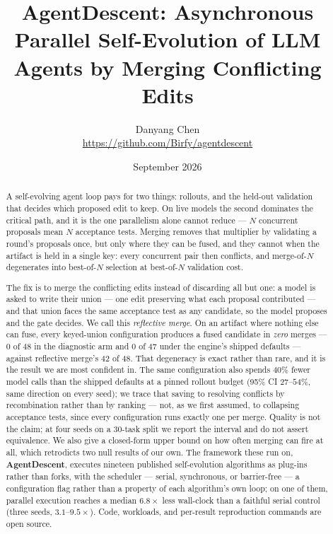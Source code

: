 \documentclass{article}
\title{AgentDescent: Asynchronous Parallel Self-Evolution of LLM Agents by Merging Conflicting Edits}
\author{
  Danyang Chen\\[2pt]
  \small\url{https://github.com/Birfy/agentdescent}
}
\date{September 2026}
\begin{document}
\maketitle

\begin{abstract}
A self-evolving agent loop pays for two things: rollouts, and the held-out validation that decides which proposed edit to keep. On live models the second dominates the critical path, and it is the one parallelism alone cannot reduce --- $N$ concurrent proposals mean $N$ acceptance tests. Merging removes that multiplier by validating a round's proposals once, but only where they can be fused, and they cannot when the artifact is held in a single key: every concurrent pair then conflicts, and merge-of-$N$ degenerates into best-of-$N$ selection at best-of-$N$ validation cost.

The fix is to merge the conflicting edits instead of discarding all but one: a model is asked to write their union --- one edit preserving what each proposal contributed --- and that union faces the same acceptance test as any candidate, so the model proposes and the gate decides. We call this \emph{reflective merge}. On an artifact where nothing else can fuse, every keyed-union configuration produces a fused candidate in \emph{zero} merges --- $0$ of $48$ in the diagnostic arm and $0$ of $47$ under the engine's shipped defaults --- against reflective merge's $42$ of $48$. That degeneracy is exact rather than rare, and it is the result we are most confident in. The same configuration also spends $40\%$ fewer model calls than the shipped defaults at a pinned rollout budget (95\% CI $27$--$54\%$, same direction on every seed); we trace that saving to resolving conflicts by recombination rather than by ranking --- not, as we first assumed, to collapsing acceptance tests, since every configuration runs exactly one per merge. Quality is not the claim; at four seeds on a 30-task split we report the interval and do not assert equivalence. We also give a closed-form upper bound on how often merging can fire at all, which retrodicts two null results of our own. The framework these run on, \textbf{AgentDescent}, executes nineteen published self-evolution algorithms as plug-ins rather than forks, with the scheduler --- serial, synchronous, or barrier-free --- a configuration flag rather than a property of each algorithm's own loop; on one of them, parallel execution reaches a median $6.8\times$ less wall-clock than a faithful serial control (three seeds, $3.1$--$9.5\times$). Code, workloads, and per-result reproduction commands are open source.
\end{abstract}
\end{document}
